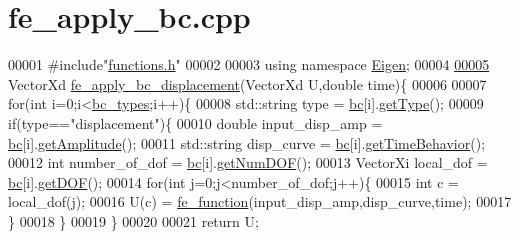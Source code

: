 \hypertarget{fe__apply__bc_8cpp_source}{}\section{fe\+\_\+apply\+\_\+bc.\+cpp}
\label{fe__apply__bc_8cpp_source}

\begin{DoxyCode}
00001 \textcolor{preprocessor}{#include"\hyperlink{functions_8h}{functions.h}"}
00002 
00003 \textcolor{keyword}{using namespace }\hyperlink{namespace_eigen}{Eigen};
00004 
\hyperlink{fe__apply__bc_8cpp_af42938e5b32edb33ef4a35866949eba6}{00005} VectorXd \hyperlink{fe__apply__bc_8cpp_af42938e5b32edb33ef4a35866949eba6}{fe\_apply\_bc\_displacement}(VectorXd U,\textcolor{keywordtype}{double} time)\{
00006 
00007  \textcolor{keywordflow}{for}(\textcolor{keywordtype}{int} i=0;i<\hyperlink{_global_variables_8h_aad28f3904552ac6aa1642c44f0bc04e7}{bc\_types};i++)\{
00008         std::string type = \hyperlink{_global_variables_8h_a20bdb84bef6e8184528b6f4394cf4f7a}{bc}[i].\hyperlink{class_b_c_aa6afb3d4586f395578bef89c77e60449}{getType}();
00009         \textcolor{keywordflow}{if}(type==\textcolor{stringliteral}{"displacement"})\{
00010             \textcolor{keywordtype}{double} input\_disp\_amp = \hyperlink{_global_variables_8h_a20bdb84bef6e8184528b6f4394cf4f7a}{bc}[i].\hyperlink{class_b_c_ad648545e6ee046075350cd9b3c88e610}{getAmplitude}();
00011             std::string disp\_curve = \hyperlink{_global_variables_8h_a20bdb84bef6e8184528b6f4394cf4f7a}{bc}[i].\hyperlink{class_b_c_a3590d0a29a9261d99f21ee75340e5722}{getTimeBehavior}();
00012             \textcolor{keywordtype}{int} number\_of\_dof = \hyperlink{_global_variables_8h_a20bdb84bef6e8184528b6f4394cf4f7a}{bc}[i].\hyperlink{class_b_c_a6e42c3db5c67435bf2616768959866e9}{getNumDOF}();
00013             VectorXi local\_dof = \hyperlink{_global_variables_8h_a20bdb84bef6e8184528b6f4394cf4f7a}{bc}[i].\hyperlink{class_b_c_a0bc8eb90956a082ada5e4daa5e32c9fc}{getDOF}();
00014             \textcolor{keywordflow}{for}(\textcolor{keywordtype}{int} j=0;j<number\_of\_dof;j++)\{
00015                 \textcolor{keywordtype}{int} c = local\_dof(j);
00016                 U(c) = \hyperlink{functions_8h_a5ce8a3cf9dcc8b599ac40f7f3a48f196}{fe\_function}(input\_disp\_amp,disp\_curve,time);
00017             \}
00018         \}
00019     \}
00020 
00021     \textcolor{keywordflow}{return} U;

\end{DoxyCode}
